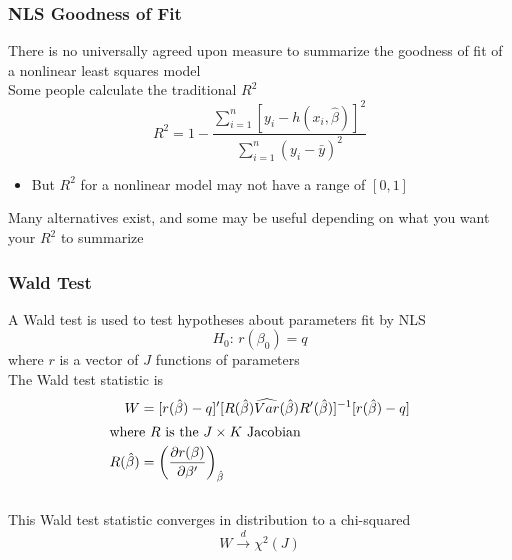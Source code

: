 \documentclass{beamer}
\begin{document}
\begin{frame}\frametitle{NLS Goodness of Fit}
    There is no universally agreed upon measure to summarize the goodness of fit of a nonlinear least squares model \\
    \vspace{3ex}
    Some people calculate the traditional $R^2$
    $$R^2 = 1 - \frac{\sum_{i = 1}^n [y_i - h(x_i, \hat{\beta})]^2}{\sum_{i = 1}^n (y_i - \bar{y})^2}$$
    \begin{itemize}
    	\item But $R^2$ for a nonlinear model may not have a range of $[0, 1]$
    \end{itemize}
    \vspace{3ex}
    Many alternatives exist, and some may be useful depending on what you want your $R^2$ to summarize
\end{frame}

\begin{frame}\frametitle{Wald Test}
    A Wald test is used to test hypotheses about parameters fit by NLS
    $$H_0 \text{: } r(\beta_0) = q$$
    where $r$ is a vector of $J$ functions of parameters \\
    \vspace{2ex}
    The Wald test statistic is
    \begin{align*}
    	W &= [r(\hat{\beta}) - q]' [ R(\hat{\beta}) \widehat{Var}(\hat{\beta}) R'(\hat{\beta})]^{-1} [r(\hat{\beta}) - q] \\
    	\intertext{where $R$ is the $J \times K$ Jacobian}
    	R(\hat{\beta}) &= \left( \frac{\partial r(\beta)}{\partial \beta'} \right)_{\hat{\beta}}
    \end{align*} \\
    \vspace{2ex}
    This Wald test statistic converges in distribution to a chi-squared
    $$W \overset{d}{\rightarrow} \chi^2(J)$$
\end{frame}
\end{document}
